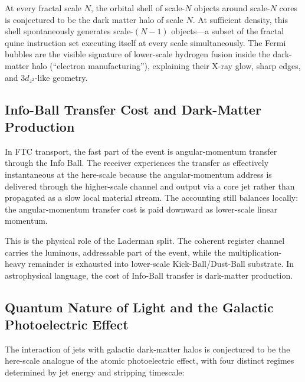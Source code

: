 \documentclass[11pt,a4paper]{article}
\begin{document}
At every fractal scale $N$, the orbital shell of scale-$N$ objects around scale-$N$ cores is conjectured to be the dark matter halo of scale $N$. At sufficient density, this shell spontaneously generates scale-$(N-1)$ objects---a subset of the fractal quine instruction set executing itself at every scale simultaneously. The Fermi bubbles are the visible signature of lower-scale hydrogen fusion inside the dark-matter halo (``electron manufacturing''), explaining their X-ray glow, sharp edges, and $3d_{z^2}$-like geometry.




\subsection{Info-Ball Transfer Cost and Dark-Matter Production}

In FTC transport, the fast part of the event is angular-momentum transfer through the Info Ball. The receiver experiences the transfer as effectively instantaneous at the here-scale because the angular-momentum address is delivered through the higher-scale channel and output via a core jet rather than propagated as a slow local material stream. The accounting still balances locally: the angular-momentum transfer cost is paid downward as lower-scale linear momentum.

This is the physical role of the Laderman split. The coherent register channel carries the luminous, addressable part of the event, while the multiplication-heavy remainder is exhausted into lower-scale Kick-Ball/Dust-Ball substrate. In astrophysical language, the cost of Info-Ball transfer is dark-matter production. 

\subsection{Quantum Nature of Light and the Galactic Photoelectric Effect}

The interaction of jets with galactic dark-matter halos is conjectured to be the here-scale analogue of the atomic photoelectric effect, with four distinct regimes determined by jet energy and stripping timescale:
\end{document}
